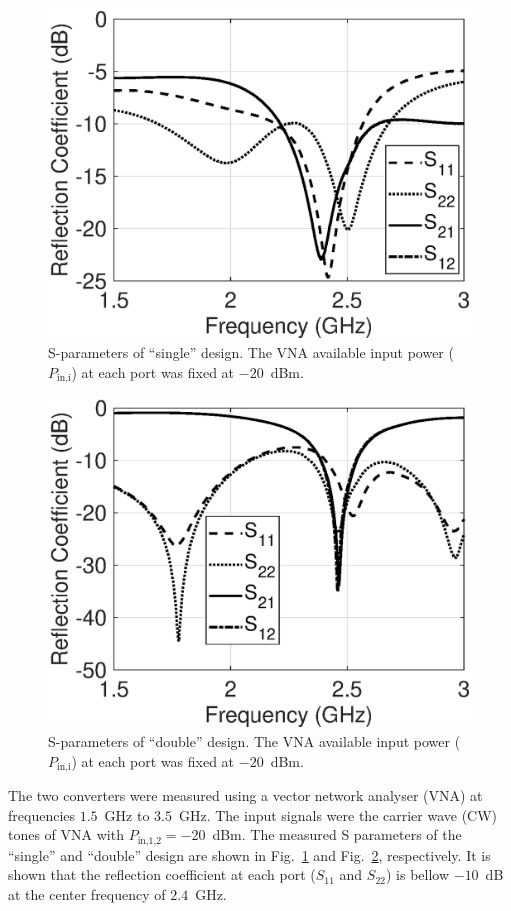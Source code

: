 \documentclass[journal]{IEEEtran}
\begin{document}
\begin{figure}[t]
\centering
\includegraphics[width=0.9\columnwidth]{Figures/Fig4.eps}
\caption{S-parameters of ``single'' design. The VNA available input power ($P_\text{in,i}$) at each port was fixed at $-20$~dBm.}
\label{fig:S11_single}
\end{figure}


\begin{figure}[t]
\centering
\includegraphics[width=0.9\columnwidth]{Figures/Fig5.eps}
\caption{S-parameters of ``double'' design. The VNA available input power ($P_\text{in,i}$) at each port was fixed at $-20$~dBm.}
\label{fig:S11_double}
\end{figure}



The  two converters were measured using a vector network analyser (VNA) at frequencies $1.5$~GHz to $3.5$~GHz.
%
The input signals were the carrier wave (CW) tones of VNA with $P_\text{in,1,2}= -20$~dBm.
%
The measured  S parameters of the ``single''  and ``double''  design  are   shown in Fig.~\ref{fig:S11_single} and Fig.~\ref{fig:S11_double}, respectively. 
%
It is shown that the reflection
coefficient at each port ($S_\text{11}$ and $S_\text{22}$) is bellow $-10$~dB at the center frequency of $2.4$~GHz. 
\end{document}
